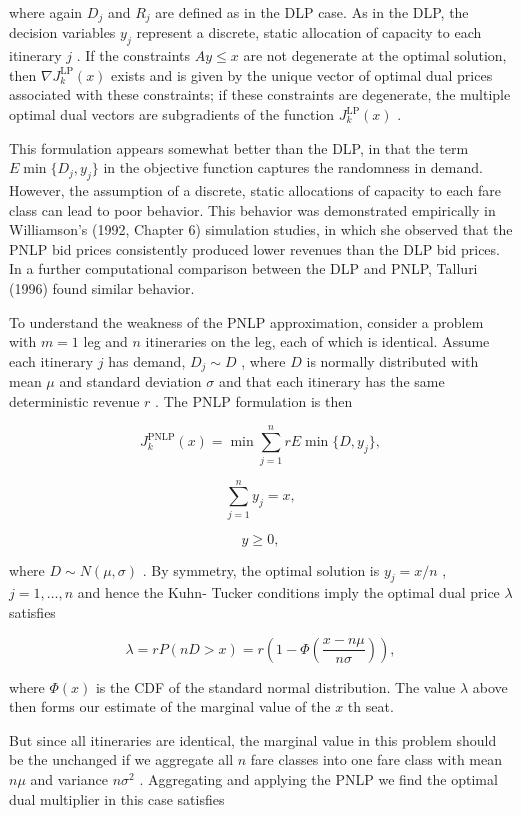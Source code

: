 where again \(D_{j}\) and \(R_{j}\) are defined as in the DLP case. As
in the DLP, the decision variables \(y_{j}\) represent a discrete,
static allocation of capacity to each itinerary \(j\) . If the
constraints \(A y \leq x\) are not degenerate at the optimal solution,
then \(\nabla J_{k}^{\mathrm{LP}}(x)\) exists and is given by the unique
vector of optimal dual prices associated with these constraints; if
these constraints are degenerate, the multiple optimal dual vectors are
subgradients of the function \(J_{k}^{\mathrm{LP}}(x)\) .

This formulation appears somewhat better than the DLP, in that the term
\(E \min \{D_{j}, y_{j}\}\) in the objective function captures the
randomness in demand. However, the assumption of a discrete, static
allocations of capacity to each fare class can lead to poor behavior.
This behavior was demonstrated empirically in Williamson's (1992,
Chapter 6) simulation studies, in which she observed that the PNLP bid
prices consistently produced lower revenues than the DLP bid prices. In
a further computational comparison between the DLP and PNLP, Talluri
(1996) found similar behavior.

To understand the weakness of the PNLP approximation, consider a problem
with \(m = 1\) leg and \(n\) itineraries on the leg, each of which is
identical. Assume each itinerary \(j\) has demand, \(D_{j} \sim D\) ,
where \(D\) is normally distributed with mean \(\mu\) and standard
deviation \(\sigma\) and that each itinerary has the same deterministic
revenue \(r\) . The PNLP formulation is then

\[
J_{k}^{\mathrm{PNLP}}(x) = \min \sum_{j = 1}^{n}r E\min \{D,y_{j}\} ,
\]

\[
\sum_{j = 1}^{n}y_{j} = x,
\]

\[
y\geq 0,
\]

where \(D \sim N(\mu , \sigma)\) . By symmetry, the optimal solution is
\(y_{j} = x / n\) , \(j = 1, \ldots , n\) and hence the Kuhn- Tucker
conditions imply the optimal dual price \(\lambda\) satisfies

\[
\lambda = r P(n D > x) = r\left(1 - \Phi \left(\frac{x - n\mu}{n\sigma}\right)\right), \tag{19}
\]

where \(\Phi (x)\) is the CDF of the standard normal distribution. The
value \(\lambda\) above then forms our estimate of the marginal value of
the \(x\) th seat.

But since all itineraries are identical, the marginal value in this
problem should be the unchanged if we aggregate all \(n\) fare classes
into one fare class with mean \(n\mu\) and variance \(n\sigma^{2}\) .
Aggregating and applying the PNLP we find the optimal dual multiplier in
this case satisfies

